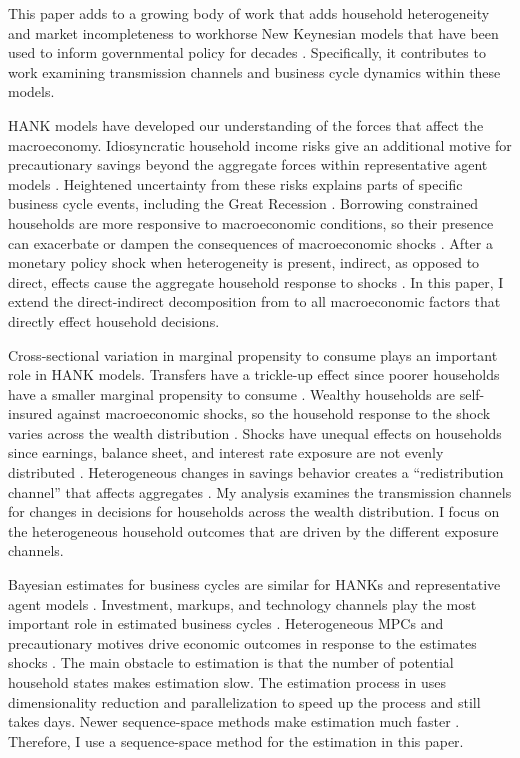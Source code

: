 This paper adds to a growing body of work that adds household heterogeneity and market incompleteness to workhorse New Keynesian models that have been used to inform governmental policy for decades \autocites{woodford2005interest}{smets2007shocks}. Specifically, it contributes to work examining transmission channels and business cycle dynamics within these models. 

HANK models have developed our understanding of the forces that affect the macroeconomy. Idiosyncratic household income risks give an additional motive for precautionary savings beyond the aggregate forces within representative agent models \autocites{mckay2016power}{auclert2020micro}{acharya2023optimal}. Heightened uncertainty from these risks explains parts of specific business cycle events, including the Great Recession \autocites{bayer2019precautionary}. Borrowing constrained households are more responsive to macroeconomic conditions, so their presence can exacerbate or dampen the consequences of macroeconomic shocks \autocites{bilbiie2020new}. After a monetary policy shock when heterogeneity is present, indirect, as opposed to direct, effects cause the aggregate household response to shocks \autocites{kaplan2018monetary}. In this paper, I extend the direct-indirect decomposition from \textcite{kaplan2018monetary} to all macroeconomic factors that directly effect household decisions. 

Cross-sectional variation in marginal propensity to consume plays an important role in HANK models. Transfers have a trickle-up effect since poorer households have a smaller marginal propensity to consume \autocite{auclert2023trickling}. Wealthy households are self-insured against macroeconomic shocks, so the household response to the shock varies across the wealth distribution \autocite{gornemann2016doves}. Shocks have unequal effects on households since earnings, balance sheet, and interest rate exposure are not evenly distributed \autocite{auclert2019monetary}. Heterogeneous changes in savings behavior creates a ``redistribution channel'' that affects aggregates \autocite{auclert2019monetary}. My analysis examines the transmission channels for changes in decisions for households across the wealth distribution. I focus on the heterogeneous household outcomes that are driven by the different exposure channels.

Bayesian estimates for business cycles are similar for HANKs and representative agent models \autocites{smets2007shocks}{bayer2024shocks}. Investment, markups, and technology channels play the most important role in estimated business cycles \autocites{auclert2020micro}{bayer2024shocks}. Heterogeneous MPCs and precautionary motives drive economic outcomes in response to the estimates shocks \autocite{auclert2020micro}. The main obstacle to estimation is that the number of potential household states makes estimation slow. The estimation process in \textcite{bayer2024shocks} uses dimensionality reduction and parallelization to speed up the process and still takes days. Newer sequence-space methods make estimation much faster \autocite{auclert2021using}. Therefore, I use a sequence-space method for the estimation in this paper. 
